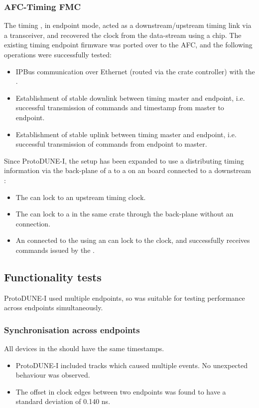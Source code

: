 \documentclass{dune}
\begin{document}
\subsubsection{AFC-Timing FMC}
The timing , in endpoint mode, acted as a downstream/upstream timing link via a  transceiver, and recovered the clock from the data-stream using a  chip.
The existing timing endpoint firmware was ported over to the AFC, and the following operations were successfully tested:
\begin{itemize}
    \item IPBus communication over Ethernet (routed via the crate controller) with the  .
    \item Establishment of stable downlink between timing master and endpoint, i.e. successful transmission of commands and timestamp from master to endpoint.
    \item Establishment of stable uplink between timing master and endpoint, i.e. successful transmission of commands from endpoint to master.
\end{itemize}
Since ProtoDUNE-I, the setup has been expanded to use a  distributing timing information via the back-plane of a  to a  on an  board connected to a downstream :
\begin{itemize}
    \item The  can lock to an upstream timing clock.
    \item The  can lock to a  in the same crate through the back-plane without an  connection.
    \item An  connected to the  using an  can lock to the clock, and successfully receives commands issued by the .
\end{itemize}

\subsection{Functionality tests}
ProtoDUNE-I used multiple endpoints, so was suitable for testing performance across endpoints simultaneously.
\subsubsection{Synchronisation across endpoints}
All devices in the  should have the same timestamps.
\begin{itemize}
  \item ProtoDUNE-I included tracks which caused multiple  events.
    No unexpected behaviour was observed.
  \item The offset in clock edges between two endpoints was found to have a standard deviation of 0.140 ns.
\end{itemize}
\end{document}
